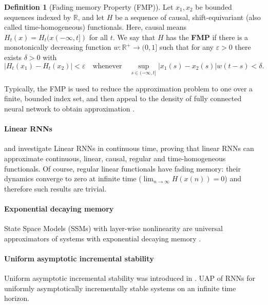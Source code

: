 \documentclass{article}
\theoremstyle{definition}
\newtheorem{definition}{Definition}
\theoremstyle{remark}
\newcounter{ct}
\begin{document}
\begin{definition}[Fading memory Property (FMP)]
Let $x_1, x_2$ be bounded sequences indexed by $\mathbb{R}$, and let $H$ be a sequence of causal, shift-equivariant (also called time-homogeneous) functionals.
Here, causal means $H_t(x) = H_t(x(-\infty,t])$ for all $t$.
We say that $H$ has the \textbf{FMP} if there is a monotonically decreasing function $w : \mathbb{R}^+ \to (0, 1]$ such that for any $\varepsilon > 0$ there exists $\delta > 0$ with 
\[
|H_t(x_1) - H_t(x_2)| < \varepsilon \quad \text{whenever} \quad \sup_{s \in (-\infty, t]} |x_1(s) - x_2(s)| w(t - s) < \delta.
\]
\end{definition}

Typically, the FMP is used to reduce the approximation problem to one over a finite, bounded index set, and then appeal to the density of fully connected neural network to obtain approximation \citep{gonon2021fading}. %


\paragraph{Linear RNNs}
\citet{li2020curse} and \citet{li2022approximation} investigate Linear RNNs in continuous time, %
proving that linear RNNs can approximate continuous, linear, causal, regular and time-homogeneous functionals. %
Of course, regular linear functionals have fading memory: their dynamics converge to zero at infinite time ($\lim_{n\rightarrow\infty} H(x(n)) = 0$) and therefore such results are trivial.
 

\paragraph{Exponential decaying memory}
State Space Models (SSMs) with layer-wise nonlinearity are universal approximators of systems with exponential decaying memory \citep{wang2024state}.


\paragraph{Uniform asymptotic incremental stability}
Uniform asymptotic incremental stability was introduced in \citep{pavlov2006uniform}.
UAP of RNNs for uniformly asymptotically incrementally stable systems on an infinite time horizon\citep{hanson2020universal, hanson2021learning}.
\end{document}
